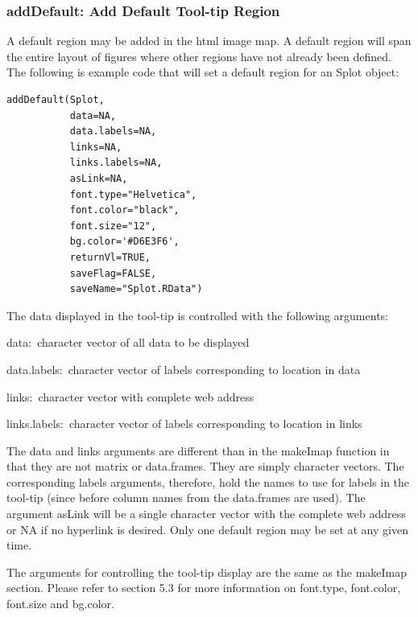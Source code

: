 \documentclass[]{article}
\begin{document}
\subsubsection{addDefault: Add Default Tool-tip Region}

A default region may be added in the html image map. A default region will span the entire layout of figures where other regions have not already been defined. The following is example code that will set a default region for an Splot object:

\begin{verbatim}
addDefault(Splot,
           data=NA,
           data.labels=NA,
           links=NA,
           links.labels=NA,
           asLink=NA,
           font.type="Helvetica",    
           font.color="black",  
           font.size="12",      
           bg.color='#D6E3F6',  
           returnVl=TRUE,
           saveFlag=FALSE,
           saveName="Splot.RData")
\end{verbatim}

\indent The data displayed in the tool-tip is controlled with the following arguments:
\begin{description}
\item{data:~}{character vector of all data to be displayed}
\item{data.labels:~}{character vector of labels corresponding to location in data}
\item{links:~}{character vector with complete web address}
\item{links.labels:~}{character vector of labels corresponding to location in links}
\end{description}

\indent The data and links arguments are different than in the makeImap function in that they are not matrix or data.frames. They are simply character vectors. The corresponding labels arguments, therefore, hold the names to use for labels in the tool-tip (since before column names from the data.frames are used). The argument asLink will be a single character vector with the complete web address or NA if no hyperlink is desired. Only one default region may be set at any given time.\newline

\indent The arguments for controlling the tool-tip display are the same as the makeImap section. Please refer to section 5.3 for more information on font.type, font.color, font.size and bg.color. \newline
\end{document}
